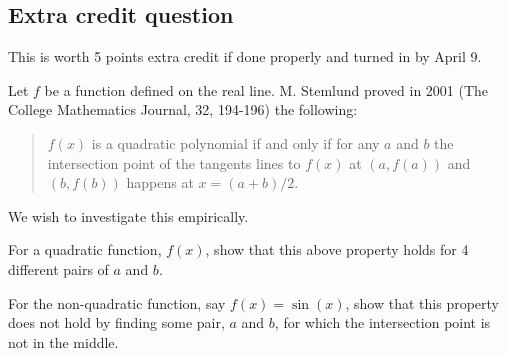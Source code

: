 \documentclass[12pt]{article}
\begin{document}
\subsection{Extra credit question}

This is worth 5 points extra credit if done properly and turned in by
April 9.

Let $f$ be a function defined on the real line. M. Stemlund proved in
2001 (The College Mathematics Journal, 32, 194-196) the following:

\begin{quote}
$f(x)$ is a quadratic polynomial if and only if for any $a$ and $b$ the
intersection point of the tangents lines to $f(x)$ at $(a, f(a))$ and
$(b, f(b))$ happens at $x=(a+b)/2$.
\end{quote}

We wish to investigate this empirically.

For a quadratic function, $f(x)$, show that this above property holds
for 4 different pairs of $a$ and $b$.

For the non-quadratic function, say $f(x) = \sin(x)$, show that this
property does not hold by finding some pair, $a$ and $b$, for which the
intersection point is not in the middle.
\end{document}
